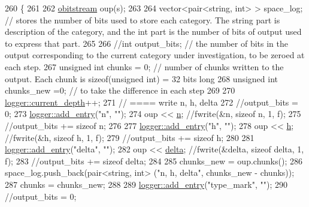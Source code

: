 \begin{DoxyCode}
260                                                   \{
261   
262   \hyperlink{classobitstream}{obitstream} oup(s);
263 
264   vector<pair<string, int> > space\_log; \textcolor{comment}{// stores the number of bits used to store each category. The
       string part is description of the category, and the int part is the number of bits of output used to express that
       part.}
265 
266   \textcolor{comment}{//int output\_bits; // the number of bits in the output corresponding to the current category under
       investigation, to be zeroed at each step.}
267   \textcolor{keywordtype}{unsigned} \textcolor{keywordtype}{int} chunks = 0; \textcolor{comment}{// number of chunks written to the output. Each chunk is sizeof(unsigned int) =
       32 bits long}
268   \textcolor{keywordtype}{unsigned} \textcolor{keywordtype}{int} chunks\_new =0; \textcolor{comment}{// to take the difference in each step}
269 
270   \hyperlink{classlogger_a9d29b49bd318a719a8e85b59eac54fe0}{logger::current\_depth}++;
271   \textcolor{comment}{// ==== write n, h, delta}
272   \textcolor{comment}{//output\_bits = 0;}
273   \hyperlink{classlogger_a710163deb17bc81f70d53d285b8ac9ac}{logger::add\_entry}(\textcolor{stringliteral}{"n"}, \textcolor{stringliteral}{""});
274   oup << \hyperlink{classmarked__graph__compressed_a8d841016ddb11cfd33748c8deb6277ba}{n}; \textcolor{comment}{//fwrite(&n, sizeof n, 1, f);}
275   \textcolor{comment}{//output\_bits += sizeof n;}
276 
277   \hyperlink{classlogger_a710163deb17bc81f70d53d285b8ac9ac}{logger::add\_entry}(\textcolor{stringliteral}{"h"}, \textcolor{stringliteral}{""});
278   oup << \hyperlink{classmarked__graph__compressed_af6ff623407b673d08d0cab77b39c2193}{h}; \textcolor{comment}{//fwrite(&h, sizeof h, 1, f);}
279   \textcolor{comment}{//output\_bits += sizeof h;}
280 
281   \hyperlink{classlogger_a710163deb17bc81f70d53d285b8ac9ac}{logger::add\_entry}(\textcolor{stringliteral}{"delta"}, \textcolor{stringliteral}{""});
282   oup << \hyperlink{classmarked__graph__compressed_a8b2aaac68e9332ddc78d88eb60b323a7}{delta}; \textcolor{comment}{//fwrite(&delta, sizeof delta, 1, f);}
283   \textcolor{comment}{//output\_bits += sizeof delta;}
284 
285   chunks\_new = oup.chunks();
286   space\_log.push\_back(pair<string, int> (\textcolor{stringliteral}{"n, h, delta"}, chunks\_new - chunks));
287   chunks = chunks\_new;
288 
289   \hyperlink{classlogger_a710163deb17bc81f70d53d285b8ac9ac}{logger::add\_entry}(\textcolor{stringliteral}{"type\_mark"}, \textcolor{stringliteral}{""});
290   \textcolor{comment}{//output\_bits = 0;}

\end{DoxyCode}
